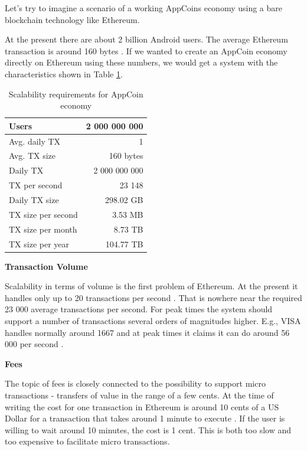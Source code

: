 Let's try to imagine a scenario of a working AppCoins economy using a bare blockchain technology like Ethereum.

At the present there are about 2 billion Android users. The average Ethereum transaction is around 160 bytes \cite{EthereumTransactions}. If we wanted to create an AppCoin economy directly on Ethereum using these numbers, we would get a system with the characteristics shown in Table \ref{table:ethereumscalability}.

\begin{table}[!htbp]
\centering
\begin{tabular}{|l|r|}
\hline
Users              & 2 000 000 000    \\ \hline
Avg. daily TX      & 1                \\ \hline
Avg. TX size       & 160 bytes        \\ \hline
Daily TX           & 2 000 000 000    \\ \hline
TX per second      & 23 148           \\ \hline
Daily TX size      & 298.02 GB        \\ \hline
TX size per second & 3.53 MB          \\ \hline
TX size per month  & 8.73 TB          \\ \hline
TX size per year   & 104.77 TB        \\ \hline
\end{tabular}
\caption{Scalability requirements for AppCoin economy}
\label{table:ethereumscalability}
\end{table}

\medskip

{\bf Transaction Volume}

Scalability in terms of volume is the first problem of Ethereum. At the present it handles only up to 20 transactions per second \cite{eth_scaling}. That is nowhere near the required 23 000 average transactions per second. For peak times the system should support a number of transactions several orders of magnitudes higher. E.g., VISA handles normally around 1667 and at peak times it claims it can do around 56 000 per second \cite{eth_scaling}.

\medskip

{\bf Fees}

The topic of fees is closely connected to the possibility to support micro transactions - transfers of value in the range of a few cents. At the time of writing the cost for one transaction in Ethereum is around 10 cents of a US Dollar for a transaction that takes around 1 minute to execute \cite{ethgasstation}. If the user is willing to wait around 10 minutes, the cost is 1 cent. This is both too slow and too expensive to facilitate micro transactions.

